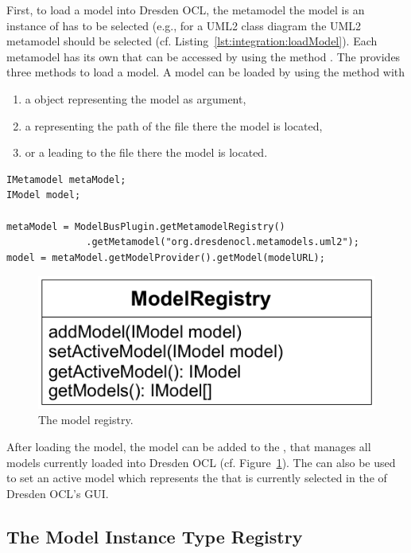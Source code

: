 First, to load a model into Dresden OCL, the metamodel the model is an instance
of has to be selected (e.g., for a \acs{UML}2 class diagram the \acs{UML}2 
metamodel should be selected (cf. Listing~\ref{lst:integration:loadModel}).
Each metamodel has its own  that can be accessed by using 
the method . The  
provides three methods to load a model. A model can be loaded by using the 
method  with

\begin{enumerate}
	\item a  object representing the model as argument,
	\item a  representing the path of the file there the model is 
	  located,
	\item or a  leading to the file there the model is located.
\end{enumerate}

\lstset{
  language=Java
}
\begin{lstlisting}[caption={How to load a model.}, captionpos=b, label=lst:integration:loadModel, float]
IMetamodel metaModel;
IModel model;

metaModel = ModelBusPlugin.getMetamodelRegistry()
              .getMetamodel("org.dresdenocl.metamodels.uml2");
model = metaModel.getModelProvider().getModel(modelURL);
\end{lstlisting}

\begin{figure}[!b]
	\centering
	\includegraphics[width=.55\linewidth]{figures/integration/modelRegistry}
	\caption{The model registry.}
	\label{pic:integration:modelRegistry}
\end{figure}

After loading the model, the model can be added to the ,
that manages all models currently loaded into Dresden OCL (cf. 
Figure~\ref{pic:integration:modelRegistry}). The  can also 
be used to set an active model which represents the  that is 
currently selected in the  of Dresden OCL's GUI.


\subsection{The Model Instance Type Registry}

